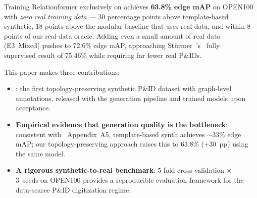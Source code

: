 Training Relationformer exclusively on \ours{} achieves \textbf{63.8\%
edge mAP} on OPEN100 with \emph{zero real training data} --- 30
percentage points above template-based synthetic, 18 points above the
modular baseline that uses real data, and within 8 points of our
real-data oracle.
Adding even a small amount of real data (E3~Mixed) pushes to 72.6\% edge
mAP, approaching Stürmer~\etal's~\cite{sturmer2025} fully supervised result
of 75.46\% while requiring far fewer real P\&IDs.

This paper makes three contributions:

\begin{itemize}[noitemsep, topsep=3pt]
    \item \textbf{\ours{}}: the first topology-preserving synthetic P\&ID
          dataset with graph-level annotations, released with the
          generation pipeline and trained models upon acceptance.
    \item \textbf{Empirical evidence that generation quality is the
          bottleneck}: consistent with~\cite{sturmer2025} Appendix~A5,
          template-based synth achieves ${\sim}33\%$ edge mAP;
          our topology-preserving approach raises this to 63.8\%
          (+30~pp) using the same model.
    \item \textbf{A rigorous synthetic-to-real benchmark}: 5-fold
          cross-validation $\times$ 3~seeds on OPEN100 provides a
          reproducible evaluation framework for the data-scarce P\&ID
          digitization regime.
\end{itemize}
